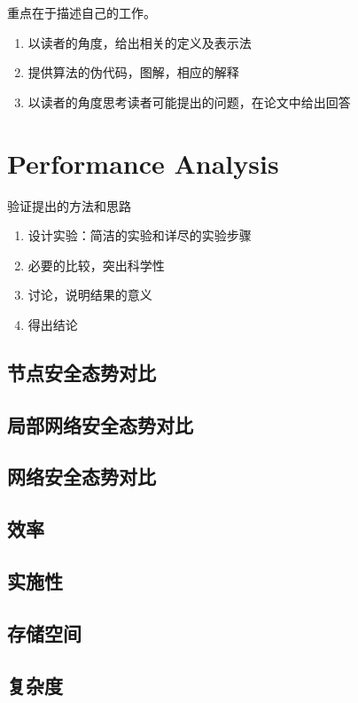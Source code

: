 \documentclass{article}
\begin{document}
\begin{large}
重点在于描述自己的工作。
\begin{enumerate}
\item 以读者的角度，给出相关的定义及表示法
\item 提供算法的伪代码，图解，相应的解释
\item 以读者的角度思考读者可能提出的问题，在论文中给出回答
\end{enumerate}

\section{Performance Analysis}

验证提出的方法和思路
\begin{enumerate}
\item 设计实验：简洁的实验和详尽的实验步骤
\item 必要的比较，突出科学性
\item 讨论，说明结果的意义
\item 得出结论
\end{enumerate}

\subsection{节点安全态势对比}

\subsection{局部网络安全态势对比}

\subsection{网络安全态势对比}

\subsection{效率}

\subsection{实施性}

\subsection{存储空间}

\subsection{复杂度}


\end{large}
\end{document}
